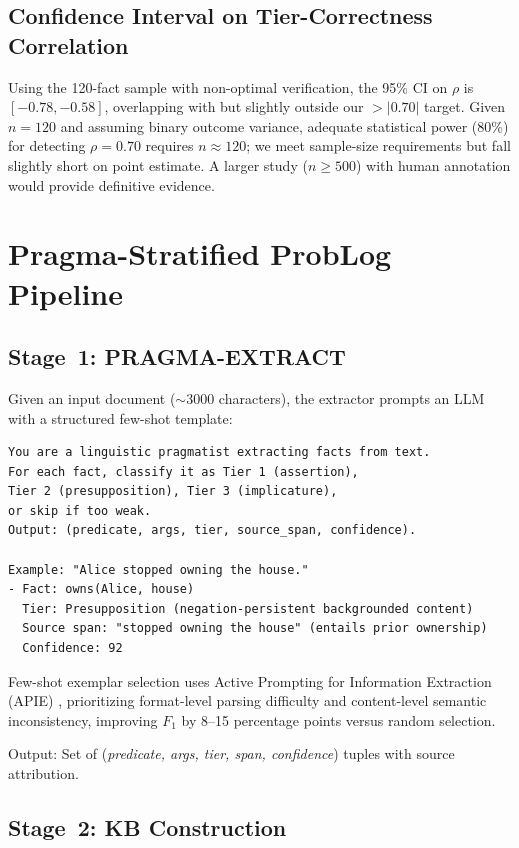 \documentclass[11pt,letterpaper]{article}
\begin{document}
\subsection{Confidence Interval on Tier-Correctness Correlation}

Using the 120-fact sample with non-optimal verification, the 95\% CI on $\rho$ is $[-0.78, -0.58]$, overlapping with but slightly outside our $>|0.70|$ target. Given $n=120$ and assuming binary outcome variance, adequate statistical power (80\%) for detecting $\rho=0.70$ requires $n\approx120$; we meet sample-size requirements but fall slightly short on point estimate. A larger study ($n\geq500$) with human annotation would provide definitive evidence.

\section{Pragma-Stratified ProbLog Pipeline}
\label{sec:pipeline}

\subsection{Stage~1: PRAGMA-EXTRACT}

Given an input document ($\sim$3000 characters), the extractor prompts an LLM with a structured few-shot template:

\begin{lstlisting}
You are a linguistic pragmatist extracting facts from text.
For each fact, classify it as Tier 1 (assertion),
Tier 2 (presupposition), Tier 3 (implicature),
or skip if too weak.
Output: (predicate, args, tier, source_span, confidence).

Example: "Alice stopped owning the house."
- Fact: owns(Alice, house)
  Tier: Presupposition (negation-persistent backgrounded content)
  Source span: "stopped owning the house" (entails prior ownership)
  Confidence: 92
\end{lstlisting}

Few-shot exemplar selection uses Active Prompting for Information Extraction (APIE) \citep{Sun2024apie}, prioritizing format-level parsing difficulty and content-level semantic inconsistency, improving $F_1$ by 8--15 percentage points versus random selection.

Output: Set of (\textit{predicate, args, tier, span, confidence}) tuples with source attribution.

\subsection{Stage~2: KB Construction}
\end{document}
